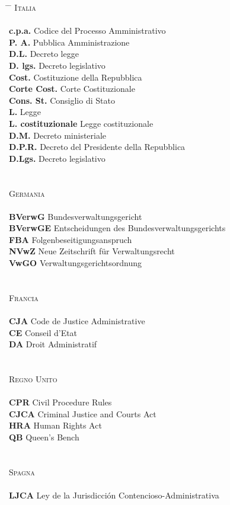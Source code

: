 \documentclass[12pt,it,a4paper,]{report}
\begin{document}
\begin{tabbing}
\hspace{12em} \= \hspace{60em} \= \kill
\textsc{Italia} \> \\
 \> \\
\textbf{c.p.a.} \> Codice del Processo Amministrativo \\
\textbf{P. A.} \> Pubblica Amministrazione \\
\textbf{D.L.} \> Decreto legge \\
\textbf{D. lgs.} \> Decreto legislativo \\
\textbf{Cost.} \> Costituzione della Repubblica \\
  \textbf{Corte Cost.} \> Corte Costituzionale \\
  \textbf{Cons. St.} \> Consiglio di Stato \\
\textbf{L.} \> Legge \\
\textbf{L. costituzionale} \> Legge costituzionale \\
\textbf{D.M.} \> Decreto ministeriale \\
\textbf{D.P.R.} \> Decreto del Presidente della Repubblica \\
\textbf{D.Lgs.} \> Decreto legislativo \\

 \> \\
 \> \\
\textsc{Germania} \> \\
 \> \\
\textbf{BVerwG} \> Bundesverwaltungsgericht \\
\textbf{BVerwGE} \> Entscheidungen des Bundesverwaltungsgerichts \\
\textbf{FBA} \> Folgenbeseitigungsanspruch \\
\textbf{NVwZ} \> Neue Zeitschrift für Verwaltungsrecht \\
\textbf{VwGO} \> Verwaltungsgerichtsordnung \\
 \> \\
 \> \\
\textsc{Francia} \> \\
 \> \\
\textbf{CJA} \> Code de Justice Administrative \\
\textbf{CE} \> Conseil d'Etat \\
\textbf{DA} \> Droit Administratif \\
 \> \\
 \> \\
\textsc{Regno Unito} \> \\
 \> \\
\textbf{CPR} \> Civil Procedure Rules \\
\textbf{CJCA} \> Criminal Justice and Courts Act \\
\textbf{HRA} \> Human Rights Act \\
\textbf{QB} \> Queen's Bench \\
 \> \\
 \> \\
\textsc{Spagna} \> \\
 \> \\
\textbf{LJCA} \> Ley de la Jurisdicción Contencioso-Administrativa \\


\end{tabbing}
\end{document}
